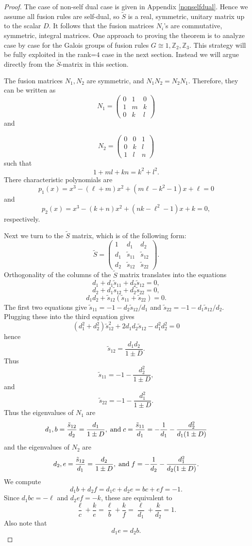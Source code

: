 \documentclass[12pt,psamsfonts]{amsart}
\newcommand{\Z}{\mathbb Z}
\newcommand{\tS}{\tilde{S}}
\newcommand{\ts}{\tilde{s}}
\numberwithin{equation}{section}
\theoremstyle{definition}
\begin{document}
\begin{proof}

The case of non-self dual case is given in Appendix
\ref{nonselfdual}. Hence we assume all fusion rules are self-dual,
so $\tS$ is a real, symmetric, unitary matrix up to the scalar $D$.
  It follows that the fusion matrices $N_i$'s are commutative, symmetric, integral matrices.
One approach to proving the theorem is to analyze case by case for
the Galois groups of fusion rules $G\cong 1, \Z_2,\Z_3$.  This
strategy will be fully exploited in the rank=$4$ case in the next
section. Instead we will argue directly from the $\tS$-matrix in
this section.

The fusion matrices $N_1,N_2$ are symmetric, and $N_1N_2=N_2N_1$.
Therefore, they can be written as \[ N_1=
 \begin{pmatrix}
   0& 1 & 0 \\
   1 & m & k \\
   0 & k & l
 \end{pmatrix}
 \] and

 \[ N_2=
 \begin{pmatrix}
   0& 0 & 1 \\
   0 & k & l \\
   1 & l  & n
 \end{pmatrix}
 \] such that $$1+ml+kn=k^2+l^2.$$  There characteristic polynomials
 are
$$p_1(x)=x^3 - (\ell+m) x^2 + (m\ell -k^2-1) x +\ell=0$$
and
$$p_2(x)=x^3 - (k+n) x^2 + (nk - \ell^2 -1) x + k =0,$$
respectively.

Next we turn to the $\tS$ matrix, which is of the following form:
\[ \tS=
 \begin{pmatrix}
   1& d_1 & d_2\\
   d_1 & \ts_{11}& \ts_{12} \\
   d_2 & \ts_{12} & \ts_{22}
 \end{pmatrix}.
 \]
Orthogonality of the columns of the $\tS$ matrix translates into
the equations
$$d_1 + d_1 \tilde{s}_{11} + d_2 \tilde{s}_{12}=0,$$
$$d_2 + d_1 \ts_{12} + d_2 \ts_{22}=0,$$
$$d_1 d_2 +\ts_{12} (\ts_{11}+\ts_{22})=0.$$
The first two equations give $\ts_{11}=-1-d_2 \ts_{12}/d_1$ and
$\ts_{22}=-1-d_1 \ts_{12}/d_2$. Plugging these into the third
equation gives
$$(d_1^2 + d_2^2) \ts_{12}^2 + 2 d_1 d_2 \ts_{12} - d_1^2 d_2^2=0$$
hence
$$\ts_{12} =\frac{d_1 d_2}{1\pm D}.$$
Thus
$$\ts_{11} = -1 - \frac{d_2^2}{1\pm D},$$
and
$$\ts_{22} = -1 -\frac{d_1^2}{1\pm D}.$$
Thus the eigenvalues of $N_1$ are
$$d_1, b=\frac{\ts_{12}}{d_2} = \frac{d_1}{1\pm D},\; {\rm and }\;
c=\frac{\ts_{11}}{d_1}=-\frac{1}{d_1} -\frac{d_2^2}{d_1 (1\pm
D)}$$ and the eigenvalues of $N_2$ are
$$d_2, e=\frac{\ts_{12}}{d_1} = \frac{d_2}{1\pm D},\; {\rm and }\;
f=-\frac{1}{d_2} -\frac{d_1^2}{d_2 (1\pm D)}.$$ We compute
$$d_1 b + d_2 f = d_1 c + d_2 e = b c + e f= -1.$$
Since $d_1 b c =-\ell$ and $d_2 e f=-k$, these are equivalent to
$$\frac{\ell}{c}+\frac{k}{e}=\frac{\ell}{b}+\frac{k}{f}
=\frac{\ell}{d_1}+\frac{k}{d_2} = 1.$$  Also note that
$$d_1 e = d_2 b.$$



\end{proof}
\end{document}
